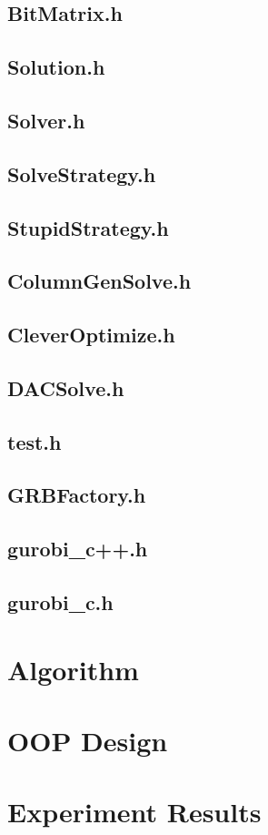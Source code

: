 \documentclass[12pt, a4paper]{article}
\begin{document}
		\subsection{BitMatrix.h}
		
		\subsection{Solution.h}
		
		\subsection{Solver.h}
		
		\subsection{SolveStrategy.h}
		
		\subsection{StupidStrategy.h}
		
		\subsection{ColumnGenSolve.h}
		
		\subsection{CleverOptimize.h}
		
		\subsection{DACSolve.h}
		
		\subsection{test.h}
		
		\subsection{GRBFactory.h}
		
		\subsection{gurobi_c++.h}
		
		\subsection{gurobi_c.h}

	\section{Algorithm}
	
	\section{OOP Design}
	
	\section{Experiment Results}
	
\end{document}
